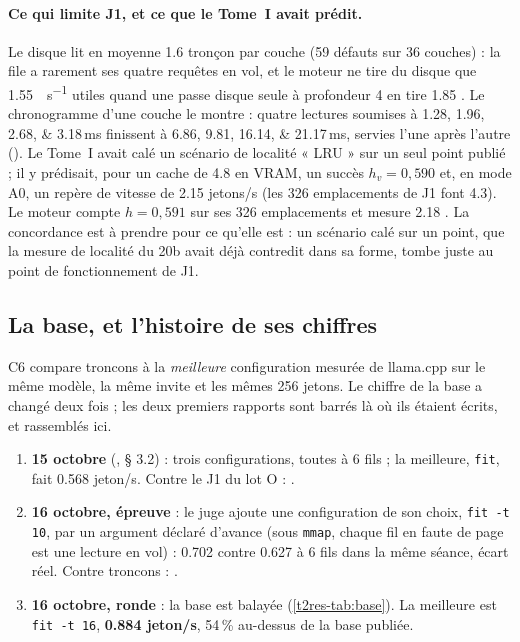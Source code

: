 \paragraph{Ce qui limite J1, et ce que le Tome~I avait prédit.} Le disque lit en moyenne \num{1.6} tronçon par couche (59 défauts sur 36 couches) : la file a rarement ses quatre requêtes en vol, et le moteur ne tire du disque que \SI{1.55}{\Go\per\second} utiles quand une passe disque seule à profondeur 4 en tire \num{1.85} \mes. Le chronogramme d'une couche le montre : quatre lectures soumises à \numlist{1.28;1.96;2.68;3.18}\,ms finissent à \numlist{6.86;9.81;16.14;21.17}\,ms, servies l'une après l'autre (). Le Tome~I avait calé un scénario de localité « LRU » sur un seul point publié ; il y prédisait, pour un cache de \SI{4.8}{\Go} en VRAM, un succès $h_v = 0{,}590$ et, en mode A0, un repère de vitesse de \num{2.15} jetons/s (les 326 emplacements de J1 font \SI{4.3}{\Go}). Le moteur compte $h = 0{,}591$ sur ses 326 emplacements et mesure \num{2.18} \mes. La concordance est à prendre pour ce qu'elle est : un scénario calé sur un point, que la mesure de localité du 20b avait déjà contredit dans sa forme, tombe juste au point de fonctionnement de J1.

\subsection{La base, et l'histoire de ses chiffres}\label{t2res-sec:base}

C6 compare troncons à la \emph{meilleure} configuration mesurée de llama.cpp sur le même modèle, la même invite et les mêmes 256 jetons. Le chiffre de la base a changé deux fois ; les deux premiers rapports sont barrés là où ils étaient écrits, et rassemblés ici.

\begin{enumerate}
\item \textbf{15 octobre} (, § 3.2) : trois configurations, toutes à 6 fils ; la meilleure, \texttt{fit}, fait \num{0.568} jeton/s. Contre le J1 du lot O : .
\item \textbf{16 octobre, épreuve} : le juge ajoute une configuration de son choix, \texttt{fit -t 10}, par un argument déclaré d'avance (sous \texttt{mmap}, chaque fil en faute de page est une lecture en vol) : \num{0.702} contre \num{0.627} à 6 fils dans la même séance, écart réel. Contre troncons : .
\item \textbf{16 octobre, ronde} : la base est balayée (\cref{t2res-tab:base}). La meilleure est \texttt{fit -t 16}, \textbf{\num{0.884} jeton/s}, \num{54}\,\% au-dessus de la base publiée.
\end{enumerate}

